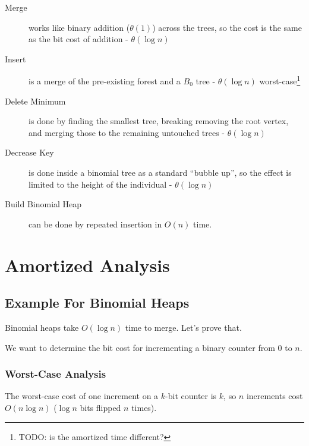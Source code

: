                 \begin{description}
                    \item[Merge] works like binary addition ($\theta(1)$) across the trees, so the cost is the same as the bit cost of addition - $\theta(\log n)$
                    \item[Insert] is a merge of the pre-existing forest and a $B_0$ tree - $\theta(\log n)$ worst-case\footnote{TODO: is the amortized time different?}
                    \item[Delete Minimum] is done by finding the smallest tree, breaking removing the root vertex, and merging those to the remaining untouched trees - $\theta(\log n)$
                    \item[Decrease Key] is done inside a binomial tree as a standard ``bubble up'', so the effect is limited to the height of the individual - $\theta(\log n)$
                    \item[Build Binomial Heap] can be done by repeated insertion in $O(n)$ time.
                \end{description}
        \chapter{Amortized Analysis} %
        \label{cha:amortized_analysis}

            \section{Example For Binomial Heaps} %
            \label{sec:example_for_binomial_heaps}
                Binomial heaps take $O(\log n)$ time to merge.
                Let's prove that.

                We want to determine the bit cost for incrementing a binary counter from $0$ to $n$.

                \subsection{Worst-Case Analysis} %
                \label{sub:worst_case_analysis}
                    The worst-case cost of one increment on a $k$-bit counter is $k$, so $n$ increments cost $O(n \log n)$ ($\log n$ bits flipped $n$ times).
